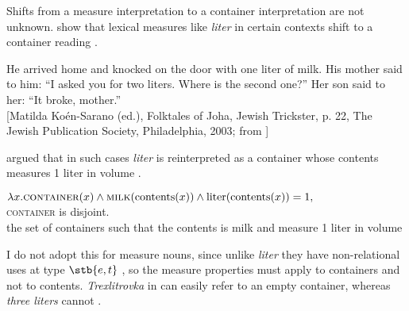 \documentclass[output=paper,
colorlinks,
citecolor=brown,
newtxmath
]{langscibook}
\begin{document}
\noindent Shifts from a measure interpretation to a container interpretation are not unknown. \citet{Khrizman.etal2015} show that lexical measures like \textit{liter} in certain contexts shift to a container reading .

\ea\label{ex:khrizmann:24} He arrived home and knocked on the door with one liter of milk. His mother said to him: ``I asked you for two liters. Where is the second one?'' Her son said to her: ``It broke, mother.'' \\
{\small [Matilda Koén-Sarano (ed.), Folktales of Joha, Jewish Trickster, p. 22, The Jewish Publication Society, Philadelphia, 2003; from \citealt[200]{Khrizman.etal2015}]}
\z

\noindent \citet{Khrizman.etal2015} argued that in such cases \textit{liter} is reinterpreted as a container whose contents measures 1 liter in volume .

\ea\label{ex:khrizmann:25} $\lambda x. \textsc{container}(x) \wedge \textsc{milk}(\textnormal{contents}(x)) \wedge \textnormal{liter}(\textnormal{contents}(x)) = 1,$\\
{\small \textsc{container} is disjoint.\\
the set of containers such that the contents is milk and measure 1 liter in volume}
\z

\noindent I do not adopt this for measure nouns, since unlike \textit{liter} they have non-relational uses at type $\stb{e,t}$ , so the measure properties must apply to containers and not to contents. \textit{Trexlitrovka} in  can easily refer to an empty container, whereas \textit{three liters} cannot .

\ea\label{ex:khrizmann:26}
\z\z
\end{document}
